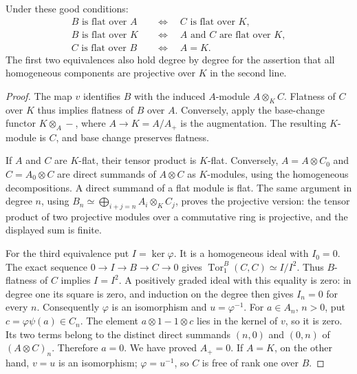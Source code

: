 \begin{theorem}\label{SA23-G-1}
Under these good conditions:
\begin{align*}
 B\text{ is flat over }A
 &\quad\Longleftrightarrow\quad C\text{ is flat over }K,\\
 B\text{ is flat over }K
 &\quad\Longleftrightarrow\quad
 A\text{ and }C\text{ are flat over }K,\\
 C\text{ is flat over }B
 &\quad\Longleftrightarrow\quad A=K.
\end{align*}
The first two equivalences also hold degree by degree for the assertion
that all homogeneous components are projective over $K$ in the second
line.
\end{theorem}
\begin{proof}
The map $v$ identifies $B$ with the induced $A$-module $A\otimes_K C$.
Flatness of $C$ over $K$ thus implies flatness of $B$ over $A$.
Conversely, apply the base-change functor $K\otimes_A-$, where
$A\to K=A/A_+$ is the augmentation.  The resulting $K$-module is
$C$, and base change preserves flatness.

If $A$ and $C$ are $K$-flat, their tensor product is $K$-flat.
Conversely, $A=A\otimes C_0$ and $C=A_0\otimes C$ are direct
summands of $A\otimes C$ as $K$-modules, using the homogeneous
decompositions.  A direct summand of a flat module is flat.  The same
argument in degree $n$, using
$B_n\simeq\bigoplus_{i+j=n}A_i\otimes_K C_j$, proves the projective
version: the tensor product of two projective modules over a commutative
ring is projective, and the displayed sum is finite.

For the third equivalence put $I=\ker\varphi$.  It is a homogeneous
ideal with $I_0=0$.  The exact sequence $0\to I\to B\to C\to0$
gives $\operatorname{Tor}_1^B(C,C)\simeq I/I^2$.  Thus $B$-flatness
of $C$ implies $I=I^2$.  A positively graded ideal with this equality
is zero: in degree one its square is zero, and induction on the degree
then gives $I_n=0$ for every $n$.  Consequently $\varphi$ is an
isomorphism and $u=\varphi^{-1}$.  For $a\in A_n$, $n>0$, put
$c=\varphi\psi(a)\in C_n$.  The element
$a\otimes1-1\otimes c$ lies in the kernel of $v$, so it is zero.
Its two terms belong to the distinct direct summands $(n,0)$ and
$(0,n)$ of $(A\otimes C)_n$.  Therefore $a=0$.  We have proved
$A_+=0$.  If $A=K$, on the other hand, $v=u$ is an isomorphism;
$\varphi=u^{-1}$, so $C$ is free of rank one over $B$.
\end{proof}

